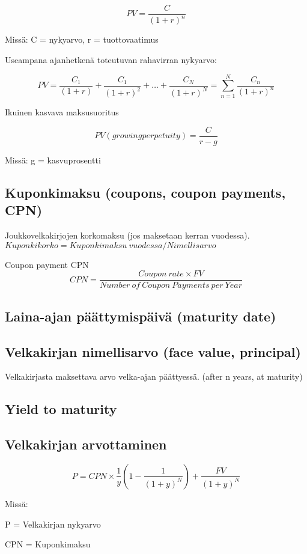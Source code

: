 \documentclass[a4paper]{article}
\begin{document}
\[
PV = \frac{C}{(1 + r)^n}
\]

Missä: C = nykyarvo, r = tuottovaatimus

Useampana ajanhetkenä toteutuvan rahavirran nykyarvo:

\[
PV = \frac{C_1}{(1 + r)} + \frac{C_1}{(1 + r)^2} + \dots + \frac{C_N}{(1 + r)^N} = \sum_{n=1}^{N} \frac{C_n}{(1 + r)^n}
\]

Ikuinen kasvava maksusuoritus

\[
PV (growing perpetuity) = \frac{C}{r - g}
\]

Missä: g = kasvuprosentti

\subsection{Kuponkimaksu (coupons, coupon payments, CPN)}

Joukkovelkakirjojen korkomaksu (jos maksetaan kerran vuodessa). $Kuponkikorko = Kuponkimaksu\ vuodessa / Nimellisarvo$

Coupon payment CPN
\[
    CPN = \frac{Coupon\ rate \times FV}{Number\ of\ Coupon\ Payments\ per\ Year}
\]

\subsection{Laina-ajan päättymispäivä (maturity date)}

\subsection{Velkakirjan nimellisarvo (face value, principal)}

Velkakirjasta maksettava arvo velka-ajan päättyessä. (after n years, at maturity)

\subsection{Yield to maturity}

\subsection{Velkakirjan arvottaminen}

\[
    P = CPN \times \frac{1}{y} (1 - \frac{1}{(1 + y)^N}) + \frac{FV}{(1 + y)^N}
\]

Missä:

P = Velkakirjan nykyarvo

CPN = Kuponkimaksu
\end{document}

